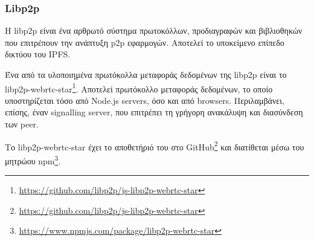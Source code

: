 \subsubsection{Libp2p} \label{subsection:4-2-4-3-libp2p}


Η libp2p είναι ένα αρθρωτό σύστημα πρωτοκόλλων, προδιαγραφών και βιβλιοθηκών που επιτρέπουν την ανάπτυξη p2p εφαρμογών. Αποτελεί το υποκείμενο επίπεδο δικτύου του IPFS.\cite{2.7-ipfs-docs}

Ένα από τα υλοποιημένα πρωτόκολλα μεταφοράς δεδομένων της libp2p είναι το libp2p-webrtc-star\footnote{\url{https://github.com/libp2p/js-libp2p-webrtc-star}}. Αποτελεί πρωτόκολλο μεταφοράς δεδομένων, το οποίο υποστηρίζεται τόσο από Node.js servers, όσο και από browsers. Περιλαμβάνει, επίσης, έναν signalling server, που επιτρέπει τη γρήγορη ανακάλυψη και διασύνδεση των peer.

Το libp2p-webrtc-star έχει το αποθετήριό του στο GitHub\footnote{\url{https://github.com/libp2p/js-libp2p-webrtc-star}} και διατίθεται μέσω του μητρώου npm\footnote{\url{https://www.npmjs.com/package/libp2p-webrtc-star}}.
